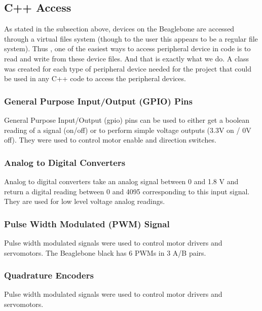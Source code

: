 \documentclass{article}
\let\Oldsubsection\subsection
\renewcommand{\subsection}{\FloatBarrier\Oldsubsection}
\let\Oldsubsubsection\subsubsection
\renewcommand{\subsubsection}{\FloatBarrier\Oldsubsubsection}
\begin{document}
\subsection{C++ Access}
As stated in the subsection above, devices on the Beaglebone are accessed through a virtual files system (though to the user this appears to be a regular file system). Thus , one of the easiest ways to access peripheral device in code is to read and write from these device files. And that is exactly what we do. A class was created for each type of peripheral device needed for the project that could be used in any C++ code to access the peripheral devices.

\subsubsection{General Purpose Input/Output (GPIO) Pins}
General Purpose Input/Output (gpio) pins can be used to either get a boolean reading of a signal (on/off) or to perform simple voltage outputs (3.3V on / 0V off). They were used to control motor enable and direction switches.
 
\clearpage

\clearpage

\subsubsection{Analog to Digital Converters}
Analog to digital converters take an analog signal between 0 and 1.8 V and return a digital reading between 0 and 4095 corresponding to this input signal. They are used for low level voltage analog readings.

\clearpage

\clearpage

\subsubsection{Pulse Width Modulated (PWM) Signal}
Pulse width modulated signals were used to control motor drivers and servomotors. The Beaglebone black has 6 PWMs in 3 A/B pairs.

\clearpage

\clearpage

\subsubsection{Quadrature Encoders}
Pulse width modulated signals were used to control motor drivers and servomotors.

\clearpage

\clearpage
\end{document}
